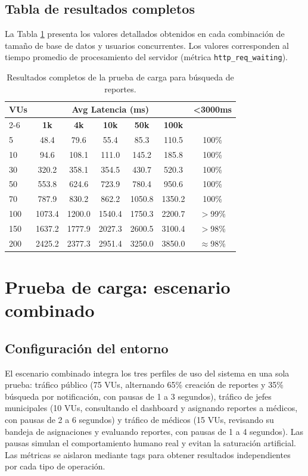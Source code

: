 \subsection{Tabla de resultados completos}

La Tabla \ref{tab:anexo-busqueda} presenta los valores detallados obtenidos en cada combinación de tamaño de base de datos y usuarios concurrentes.
Los valores corresponden al tiempo promedio de procesamiento del servidor (métrica \texttt{http\_req\_waiting}).

\begin{table}[H]
\centering
\caption{Resultados completos de la prueba de carga para búsqueda de reportes.}
\label{tab:anexo-busqueda}
\footnotesize
\begin{tabular}{lcccccc}
\hline
\multirow{2}{*}{\textbf{VUs}} & \multicolumn{5}{c}{\textbf{Avg Latencia (ms)}} & \multirow{2}{*}{\textbf{<3000ms}} \\
\cline{2-6}
 & \textbf{1k} & \textbf{4k} & \textbf{10k} & \textbf{50k} & \textbf{100k} & \\
\hline
5   & 48.4  & 79.6  & 55.4  & 85.3  & 110.5 & 100\% \\
10  & 94.6  & 108.1 & 111.0 & 145.2 & 185.8 & 100\% \\
30  & 320.2 & 358.1 & 354.5 & 430.7 & 520.3 & 100\% \\
50  & 553.8 & 624.6 & 723.9 & 780.4 & 950.6 & 100\% \\
70  & 787.9 & 830.2 & 862.2 & 1050.8 & 1350.2 & 100\% \\
100 & 1073.4 & 1200.0 & 1540.4 & 1750.3 & 2200.7 & $>$99\% \\
150 & 1637.2 & 1777.9 & 2027.3 & 2600.5 & 3100.4 & $>$98\% \\
200 & 2425.2 & 2377.3 & 2951.4 & 3250.0 & 3850.0 & $\approx$98\% \\
\hline
\end{tabular}
\end{table}

\section{Prueba de carga: escenario combinado}
\label{anexo:k6-combinado}

\subsection{Configuración del entorno}

El escenario combinado integra los tres perfiles de uso del sistema en una sola prueba: tráfico público (75 VUs, alternando 65\% creación de reportes y 35\% búsqueda por notificación, con pausas de 1 a 3 segundos), tráfico de jefes municipales (10 VUs, consultando el dashboard y asignando reportes a médicos, con pausas de 2 a 6 segundos) y tráfico de médicos (15 VUs, revisando su bandeja de asignaciones y evaluando reportes, con pausas de 1 a 4 segundos). Las pausas simulan el comportamiento humano real y evitan la saturación artificial. Las métricas se aislaron mediante tags para obtener resultados independientes por cada tipo de operación.

